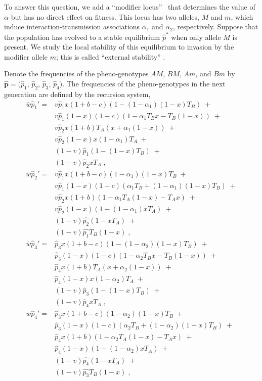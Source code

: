 \documentclass[12pt]{extarticle}
\let\vec\mathbf
\begin{document}
To answer this question, we add a ``modifier locus''~\citep{Feldman1972,Liberman1986general,Liberman1986modifiers,Liberman1988} that determines the value of $\alpha$ but has no direct effect on fitness.
This locus has two alleles, $M$ and $m$, which induce interaction-transmission associations $\alpha_1$ and $\alpha_2$, respectively.
Suppose that the population has evolved to a stable equilibrium $\hat{p}^*$  when only allele $M$ is present.
We study the local stability of this equilibrium to invasion by the modifier allele $m$; this is called ``external stability'' \citep{Liberman1986modifiers,Altenberg2017}.

Denote the frequencies of the pheno-genotypes $AM$, $BM$, $Am$, and $Bm$ by $\vec{\hat{p}}= (\hat{p}_1$, $\hat{p}_2$, $\hat{p}_3$, $\hat{p}_4)$. 
The frequencies of the pheno-genotypes in the next generation are defined by the recursion system, 
\begin{equation} \label{eq:next_gen_p_1}
  \begin{aligned}
  \bar{w}\hat{p}_1' = 
  & v \hat{p}_1 x (1+b-c)(1 - (1-\alpha_1)(1-x)T_B) \;+ \\
  & v \hat{p}_1(1-x)(1-c)(1-\alpha_1T_B x - T_B(1-x)) \;+ \\
  & v\hat{p}_2 x (1+b)T_A(x + \alpha_1(1-x)) \;+ \\
  & v\hat{p}_2(1-x)x(1-\alpha_1)T_A \;+ \\
  & (1-v)\hat{p}_1(1-(1-x)T_B)\;+ \\
  & (1-v)\hat{p}_2xT_A\;,
\\
  \bar{w}\hat{p}_2' = 
  & v\hat{p}_1 x (1+b-c)(1-\alpha_1)(1-x)T_B \;+ \\
  & v\hat{p}_1(1-x)(1-c)(\alpha_1 T_B + (1-\alpha_1)(1-x)T_B) \;+ \\
  & v\hat{p}_2 x (1+b)(1-\alpha_1 T_A(1-x) - T_A x) \;+ \\
  & v\hat{p}_2(1-x)(1 - (1-\alpha_1) x T_A) \;+ \\
  & (1-v)\hat{p_2}(1-xT_A) \; + \\
  & (1-v)\hat{p_1}T_B(1-x)\;,
\\
  \bar{w}\hat{p}_3' =
  & \hat{p}_3 x (1+b-c)(1 - (1-\alpha_2)(1-x)T_B) \;+ \\
  & \hat{p}_3(1-x)(1-c)(1-\alpha_2 T_B x - T_B(1-x)) \;+ \\
  & \hat{p}_4 x (1+b)T_A(x + \alpha_2 (1-x)) \;+ \\
  & \hat{p}_4(1-x) x (1-\alpha_2)T_A\; + \\
  & (1-v)\hat{p}_3(1-(1-x)T_B)\;+ \\
  & (1-v)\hat{p}_4xT_A\;,
\\
  \bar{w}\hat{p}_4' =
  & \hat{p}_3 x (1+b-c)(1-\alpha_2)(1-x)T_B \;+ \\
  & \hat{p}_3(1-x)(1-c)(\alpha_2 T_B + (1-\alpha_2)(1-x)T_B) \;+ \\
  & \hat{p}_4 x (1+b)(1-\alpha_2T_A(1-x)-T_A x ) \;+ \\
  & \hat{p}_4(1-x)(1 - (1-\alpha_2) x T_A) \; + \\
  & (1-v)\hat{p_4}(1-xT_A) \; + \\
  & (1-v)\hat{p_3}T_B(1-x)\;,
  \end{aligned}
\end{equation}
\end{document}
